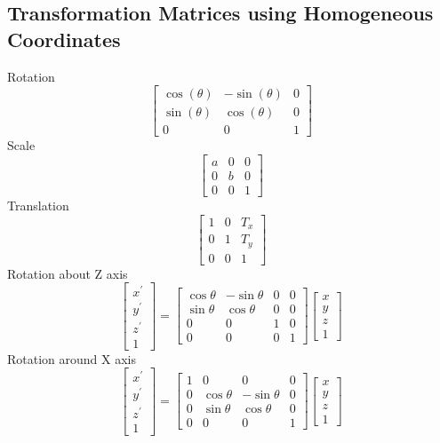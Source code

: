 \documentclass{article}[18pt]
\begin{document}
\subsection{Transformation Matrices using Homogeneous Coordinates}
Rotation
$$
\left[\begin{array}{ccc}{\cos (\theta)} & {-\sin (\theta)} & {0} \\ {\sin (\theta)} & {\cos (\theta)} & {0} \\ {0} & {0} & {1}\end{array}\right]
$$
Scale
$$
\left[\begin{array}{lll}{a} & {0} & {0} \\ {0} & {b} & {0} \\ {0} & {0} & {1}\end{array}\right]
$$
Translation
$$
\left[\begin{array}{ccc}{1} & {0} & {T_{x}} \\ {0} & {1} & {T_{y}} \\ {0} & {0} & {1}\end{array}\right]
$$
Rotation about Z axis
$$
\left[\begin{array}{c}{x^{\prime}} \\ {y^{\prime}} \\ {z^{\prime}} \\ {1}\end{array}\right]=\left[\begin{array}{cccc}{\cos \theta} & {-\sin \theta} & {0} & {0} \\ {\sin \theta} & {\cos \theta} & {0} & {0} \\ {0} & {0} & {1} & {0} \\ {0} & {0} & {0} & {1}\end{array}\right]\left[\begin{array}{l}{x} \\ {y} \\ {z} \\ {1}\end{array}\right]
$$
Rotation around X axis
$$
\left[\begin{array}{c}{x^{\prime}} \\ {y^{\prime}} \\ {z^{\prime}} \\ {1}\end{array}\right]=\left[\begin{array}{cccc}{1} & {0} & {0} & {0} \\ {0} & {\cos \theta} & {-\sin \theta} & {0} \\ {0} & {\sin \theta} & {\cos \theta} & {0} \\ {0} & {0} & {0} & {1}\end{array}\right]\left[\begin{array}{l}{x} \\ {y} \\ {z} \\ {1}\end{array}\right]
$$
\end{document}

